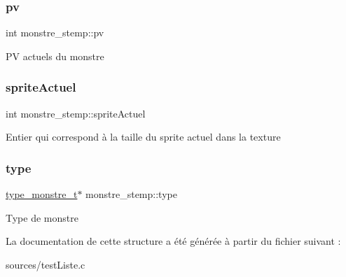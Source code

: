\subsubsection{\texorpdfstring{pv}{pv}}
{\footnotesize\ttfamily int monstre\+\_\+stemp\+::pv}

PV actuels du monstre \mbox{\label{structmonstre__stemp_a9df0eed055016b07d7c23407c1b39ecf}} 
\subsubsection{\texorpdfstring{sprite\+Actuel}{spriteActuel}}
{\footnotesize\ttfamily int monstre\+\_\+stemp\+::sprite\+Actuel}

Entier qui correspond à la taille du sprite actuel dans la texture \mbox{\label{structmonstre__stemp_a6f6979ed10551a56ffba65e75bf0ea32}} 
\subsubsection{\texorpdfstring{type}{type}}
{\footnotesize\ttfamily \hyperlink{structtype__monstre__s}{type\+\_\+monstre\+\_\+t}$\ast$ monstre\+\_\+stemp\+::type}

Type de monstre 

La documentation de cette structure a été générée à partir du fichier suivant \+:\begin{DoxyCompactItemize}
\item 
sources/test\+Liste.\+c\end{DoxyCompactItemize}
